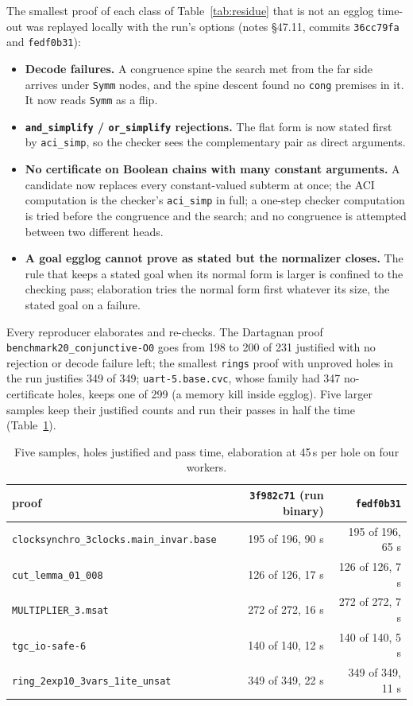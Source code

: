 \documentclass[11pt,a4paper]{article}
\newcommand{\code}[1]{\texttt{#1}}
\begin{document}
The smallest proof of each class of Table~\ref{tab:residue} that is not an
egglog time-out was replayed locally with the run's options (notes
\S47.11, commits \code{36cc79fa} and \code{fedf0b31}):
\begin{itemize}
  \item \textbf{Decode failures.} A congruence spine the search met from
    the far side arrives under \code{Symm} nodes, and the spine descent
    found no \code{cong} premises in it. It now reads \code{Symm} as a
    flip.
  \item \textbf{\code{and\_simplify} / \code{or\_simplify} rejections.}
    The flat form is now stated first by \code{aci\_simp}, so the checker
    sees the complementary pair as direct arguments.
  \item \textbf{No certificate on Boolean chains with many constant
    arguments.} A candidate now replaces every constant-valued subterm at
    once; the ACI computation is the checker's \code{aci\_simp} in full; a
    one-step checker computation is tried before the congruence and the
    search; and no congruence is attempted between two different heads.
  \item \textbf{A goal egglog cannot prove as stated but the normalizer
    closes.} The rule that keeps a stated goal when its normal form is
    larger is confined to the checking pass; elaboration tries the normal
    form first whatever its size, the stated goal on a failure.
\end{itemize}
Every reproducer elaborates and re-checks. The Dartagnan proof
\code{benchmark20\_conjunctive-O0} goes from 198 to 200 of 231 justified with
no rejection or decode failure left; the smallest \code{rings} proof with
unproved holes in the run justifies 349 of 349; \code{uart-5.base.cvc},
whose family had 347 no-certificate holes, keeps one of 299 (a memory kill
inside egglog). Five larger samples keep their justified counts and run
their passes in half the time (Table~\ref{tab:samples}).

\begin{table}[htbp]\centering\small
\begin{tabular}{lrr}
\toprule
proof & \code{3f982c71} (run binary) & \code{fedf0b31} \\
\midrule
\code{clocksynchro\_3clocks.main\_invar.base} & 195 of 196, 90 s & 195 of 196, 65 s \\
\code{cut\_lemma\_01\_008} & 126 of 126, 17 s & 126 of 126, 7 s \\
\code{MULTIPLIER\_3.msat} & 272 of 272, 16 s & 272 of 272, 7 s \\
\code{tgc\_io-safe-6} & 140 of 140, 12 s & 140 of 140, 5 s \\
\code{ring\_2exp10\_3vars\_1ite\_unsat} & 349 of 349, 22 s & 349 of 349, 11 s \\
\bottomrule
\end{tabular}
\caption{Five samples, holes justified and pass time, elaboration at 45\,s
  per hole on four workers.}\label{tab:samples}
\end{table}
\end{document}
